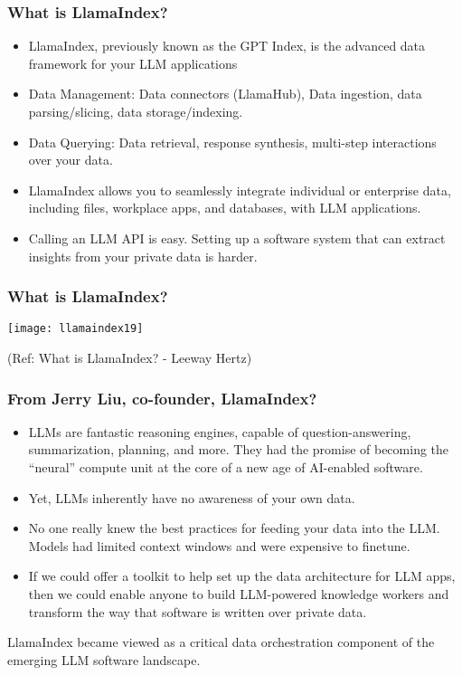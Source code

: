 \begin{frame}[fragile]\frametitle{What is LlamaIndex?}

\begin{itemize}
\item LlamaIndex, previously known as the GPT Index, is the advanced data framework for your LLM applications
\item Data Management: Data connectors (LlamaHub), Data ingestion, data parsing/slicing, data storage/indexing.
\item Data Querying: Data retrieval, response synthesis, multi-step interactions over your data.
\item LlamaIndex allows you to seamlessly integrate individual or enterprise data, including files, workplace apps, and databases, with LLM applications. 
\item Calling an LLM API is easy. Setting up a software system that can extract insights from your private data is harder.
\end{itemize}	

\end{frame}


\begin{frame}[fragile]\frametitle{What is LlamaIndex?}

\begin{center}
\texttt{[image: llamaindex19]}

{\tiny (Ref: What is LlamaIndex? - Leeway Hertz)}
\end{center}
\end{frame}

\begin{frame}[fragile]\frametitle{From Jerry Liu, co-founder, LlamaIndex?}

\begin{itemize}
\item LLMs are fantastic reasoning engines, capable of question-answering, summarization, planning, and more. They had the promise of becoming the “neural” compute unit at the core of a new age of AI-enabled software.
\item Yet, LLMs inherently have no awareness of your own data.
\item No one really knew the best practices for feeding your data into the LLM. Models had limited context windows and were expensive to finetune.
\item If we could offer a toolkit to help set up the data architecture for LLM apps, then we could enable anyone to build LLM-powered knowledge workers and transform the way that software is written over private data.
\end{itemize}	

LlamaIndex became viewed as a critical data orchestration component of the emerging LLM software landscape.

\end{frame}


